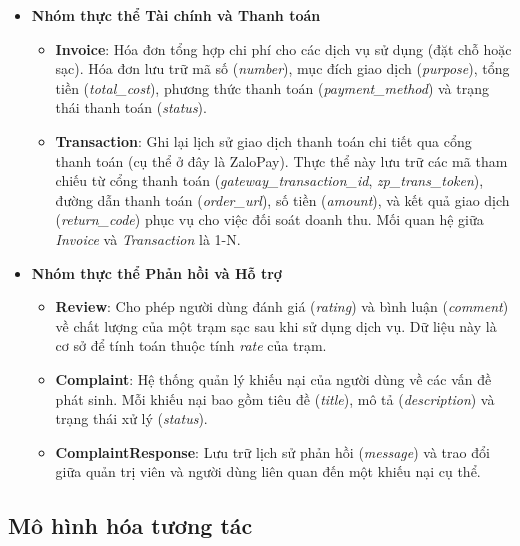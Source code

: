 \begin{itemize}
\begin{itemize}
    \end{itemize}
    \item \textbf{Nhóm thực thể Tài chính và Thanh toán}
    \begin{itemize}
        \item \textbf{Invoice}: Hóa đơn tổng hợp chi phí cho các dịch vụ sử dụng (đặt chỗ hoặc sạc). Hóa đơn lưu trữ mã số (\textit{number}), mục đích giao dịch (\textit{purpose}), tổng tiền (\textit{total\_cost}), phương thức thanh toán (\textit{payment\_method}) và trạng thái thanh toán (\textit{status}).
        \item \textbf{Transaction}: Ghi lại lịch sử giao dịch thanh toán chi tiết qua cổng thanh toán (cụ thể ở đây là ZaloPay). Thực thể này lưu trữ các mã tham chiếu từ cổng thanh toán (\textit{gateway\_transaction\_id}, \textit{zp\_trans\_token}), đường dẫn thanh toán (\textit{order\_url}), số tiền (\textit{amount}), và kết quả giao dịch (\textit{return\_code}) phục vụ cho việc đối soát doanh thu. Mối quan hệ giữa \textit{Invoice} và \textit{Transaction} là 1-N.
    \end{itemize}
    \item \textbf{Nhóm thực thể Phản hồi và Hỗ trợ}
    \begin{itemize}
        \item \textbf{Review}: Cho phép người dùng đánh giá (\textit{rating}) và bình luận (\textit{comment}) về chất lượng của một trạm sạc sau khi sử dụng dịch vụ. Dữ liệu này là cơ sở để tính toán thuộc tính \textit{rate} của trạm.
        \item \textbf{Complaint}: Hệ thống quản lý khiếu nại của người dùng về các vấn đề phát sinh. Mỗi khiếu nại bao gồm tiêu đề (\textit{title}), mô tả (\textit{description}) và trạng thái xử lý (\textit{status}).
        \item \textbf{ComplaintResponse}: Lưu trữ lịch sử phản hồi (\textit{message}) và trao đổi giữa quản trị viên và người dùng liên quan đến một khiếu nại cụ thể.
    \end{itemize}
\end{itemize}


\subsection{Mô hình hóa tương tác}
